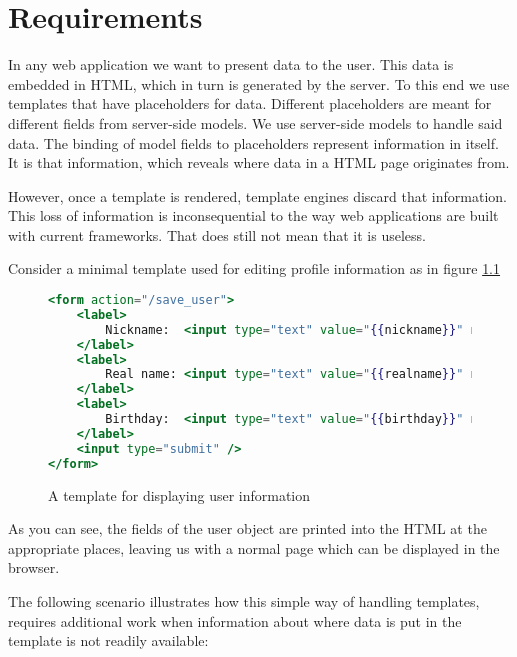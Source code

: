 \documentclass[thesis.tex]{subfiles}
\begin{document}
\chapter{Requirements}
\label{chap:requirements}
In any web application we want to present data to the user.
This data is embedded in HTML, which in turn is generated by the server.
To this end we use templates that have placeholders for data.
Different placeholders are meant for different fields from server-side models.
We use server-side models to handle said data.
The binding of model fields to placeholders represent information in
itself. It is that information, which reveals where data in a HTML page
originates from.

However, once a template is rendered, template engines discard that information.
This loss of information is inconsequential to the way web applications are
built with current frameworks. That does still not mean that it is useless.

Consider a minimal template used for editing profile information as in
figure \ref{fig:user.mustache}
\todo{\dots}
\begin{figure}
	\centering
	\begin{lstlisting}[language=mustache]
<form action="/save_user">
	<label>
		Nickname:  <input type="text" value="{{nickname}}" name="nickname" />
	</label>
	<label>
		Real name: <input type="text" value="{{realname}}" name="realname" />
	</label>
	<label>
		Birthday:  <input type="text" value="{{birthday}}" name="birthday" />
	</label>
	<input type="submit" />
</form>
	\end{lstlisting}
	\caption{A template for displaying user information}
	\label{fig:user.mustache}
\end{figure}

As you can see, the fields of the user object are printed into the HTML
at the appropriate places, leaving us with a normal page which can be
displayed in the browser.

The following scenario illustrates how this simple way of handling templates,
requires additional work when information about where data is put in the
template is not readily available:
\end{document}
